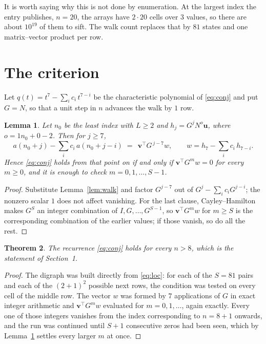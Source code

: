 \documentclass[11pt,a4paper]{article}
\theoremstyle{plain}
\newtheorem{theorem}{Theorem}
\newtheorem{lemma}[theorem]{Lemma}
\theoremstyle{definition}
\begin{document}
It is worth saying why this is not done by enumeration. At the largest index the entry
publishes, $n=20$, the arrays have $2\cdot20$ cells over
$3$ values, so there are about $10^{19}$ of them to sift. The
walk count replaces that by $81$ states and one matrix--vector product per row.
\section{The criterion}

Let $q(t)=t^{7}-\sum_i c_i\,t^{7-i}$ be the characteristic polynomial of
\eqref{eq:conj} and put $G=N$, so that a unit step in $n$ advances the walk by
$1$ row.

\begin{lemma}\label{lem:crit}
Let $n_0$ be the least index with $L\ge2$ and $h_j=G^{j}N^{o}\mathbf{u}$, where
$o=1n_0+0-2$. Then for $j\ge7$,
\[
a(n_0+j)-\sum_i c_i\,a(n_0+j-i)\;=\;\,\mathbf{v}^{\!\top}G^{\,j-7}w,
\qquad w=h_{7}-\sum_i c_i\,h_{7-i} .
\]
Hence \eqref{eq:conj} holds from that point on if and only if
$\mathbf{v}^{\!\top}G^{m}w=0$ for every $m\ge0$, and it is enough to check
$m=0,1,\dots,S-1$.
\end{lemma}

\begin{proof}
Substitute Lemma~\ref{lem:walk} and factor $G^{j-7}$ out of
$G^{j}-\sum_ic_iG^{j-i}$; the nonzero scalar $1$ does not affect
vanishing. For the last clause, Cayley--Hamilton makes $G^{S}$ an integer combination of
$I,G,\dots,G^{S-1}$, so $\mathbf{v}^{\!\top}G^{m}w$ for $m\ge S$ is the corresponding
combination of the earlier values; if those vanish, so do all the rest.
\end{proof}

\begin{theorem}
The recurrence \eqref{eq:conj} holds for every $n>8$, which is the statement of
Section~1.
\end{theorem}

\begin{proof}
The digraph was built directly from \eqref{eq:loc}: for each of the $S=81$ pairs and each
of the $(2+1)^{2}$ possible next rows, the condition was tested on every cell of
the middle row. The vector $w$ was formed by $7$ applications of $G$ in exact integer
arithmetic and $\mathbf{v}^{\!\top}G^{m}w$ evaluated for $m=0,1,\dots$, again exactly.
Every one of those integers vanishes from the index corresponding to $n=8+1$ onwards,
and the run was continued until $S+1$ consecutive zeros had been seen, which by
Lemma~\ref{lem:crit} settles every larger $m$ at once.
\end{proof}
\end{document}
